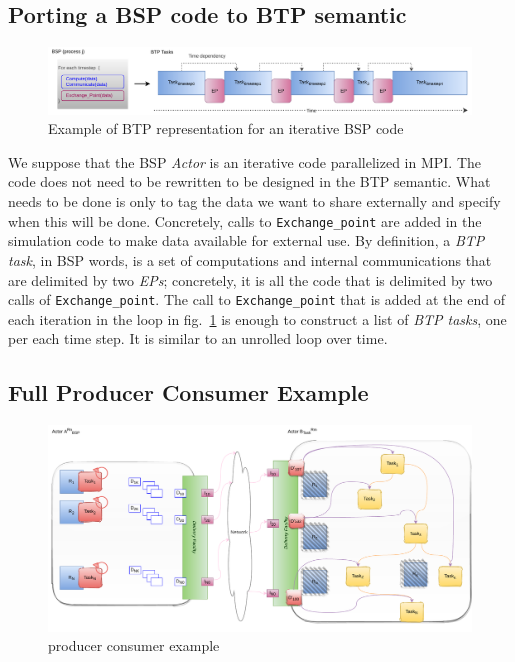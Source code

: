 \subsection{Porting a BSP code to BTP semantic}

\begin{figure}[tb]
\centerline{\includegraphics[width=\textwidth]{figures/unrolled.pdf}}
\caption{Example of BTP representation for an iterative BSP code}
\label{figunroll}
\end{figure}

We suppose that the BSP \textit{Actor} is an iterative code parallelized in MPI. The code does not need to be rewritten to be designed in the BTP semantic. What needs to be done is only to tag the data we want to share externally and specify when this will be done. Concretely, calls to \texttt{Exchange\_point} are added in the simulation code to make data available for external use. By definition, a \textit{BTP task}, in BSP words, is a set of computations and internal communications that are delimited by two \textit{EPs}; concretely, it is all the code that is delimited by two calls of \texttt{Exchange\_point}. The call to \texttt{Exchange\_point} that is added at the end of each iteration in the loop in fig.~\ref{figunroll} is enough to construct a list of \textit{BTP tasks}, one per each time step. It is similar to an unrolled loop over time.


\subsection{Full Producer Consumer Example}\label{FullPCExample}

 
\begin{figure}[tb]\centering
\includegraphics[width=\columnwidth]{figures/BTP.pdf}
\caption{producer consumer example}
\label{figBTP}
\end{figure}

